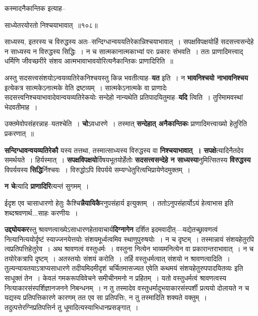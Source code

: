 \documentclass[article,12pt,a4paper]{memoir}
\begin{document}
	  \pstart कस्मादनैकान्तिक इत्याह--
	\pend
        
	  \bigskip
	  \begingroup
	

	  \pstart साध्येतरयोरतो निश्चयाभावात् ॥१०८॥
	\pend
      
	  \endgroup
	 

	  \pstart साध्यस्य, इतरस्य च विरुद्धस्य अतः--सन्दिग्धान्वययतिरेकान्निश्चयाभावात् । सपक्षविपक्षयोर्हि सदसत्त्वसन्देहे न साध्यस्य न विरुद्धस्य सिद्धिः । न च सात्मकानात्मकाभ्यां परः प्रकारः संभवति । ततः प्राणादिमत्त्वाद् धर्मिणि जीवच्छरीरे संशय आत्मभावाभावयोरित्यनैकान्तिकः प्राणादिरिति ॥
	\pend
      
	  \endgroup
	

	  \pstart अस्तु सदसत्त्वसंशयोऽन्वयव्यतिरेकनिश्चयस्तु किन्न भवतीत्याह--\textbf{यत} इति । न \textbf{भावनिश्चयो नाभावनिश्चय} इत्येकत्र सात्मकेऽनात्मके वेति द्रष्टव्यम् । सात्मकेऽनात्मके वा प्राणादेः सदसत्त्वनिश्चयाभावादेवान्वयव्यतिरेकयोः सन्देहो नान्यथेति प्रतिपादयितुमाह--\textbf{यदि} त्विति । तुरिमामवस्थां भेदवतीमाह ।
	\pend
      

	  \pstart उक्तमेवोपसंहरन्नाह--यतश्चेति । \textbf{चो}ऽवधारणे । तस्मात् \textbf{सन्देहात् अनैकान्तिकः} प्राणादिमत्त्वाख्यो हेतुरिति प्रकरणात् ॥
	\pend
      

	  \pstart \textbf{सन्दिग्धावन्वयव्यतिरेकौ} यस्य तत्तथा, तस्मात्साध्यस्य विरुद्धस्य वा \textbf{निश्चयाभावात् । सपक्षे}त्यादि\leavevmode{}नैतदेव समर्थयते । हिर्यस्मात् । \textbf{सपक्षविपक्षयो}र्विषयभूतयोर्हेतोः \textbf{सदसत्त्वसन्देहे न साध्यस्या}नुमित्सितस्य \textbf{विरुद्धस्य} विपर्ययस्य \textbf{सिद्धि}र्निश्चयः । विरुद्धोऽपि विपर्यये सम्यग्धेतुरित्यभिप्रायेणेदमुक्तम् ।
	\pend
      

	  \pstart \textbf{न चे}त्यादि \textbf{प्राणादिरि}त्यन्तं सुगमम् ।
	\pend
      

	  \pstart ईदृश एव चासाधारणो हेतुः कैश्चि\textbf{न्नैयायिकै}रनुपसंहार्य इत्युक्तम् । ततोऽनुपसंहार्योऽयं हेत्वाभास इति शब्दश्रवणार्थ...साहः करणीयः ।
	\pend
      

	  \pstart \textbf{उद्द्योयकर}स्तु श्रावणत्वाख्येऽसाधारणहेतावाचार्य\textbf{दिग्नागेन} दर्शित इदमवादीत्—यद्येतच्छ्रावणत्वं नित्यानित्ययोर्दृष्टं स्याज्जनयेत्तयोः संशयमूर्ध्वत्वमिव स्थाणुपुरुषयोः । न च दृष्टम् । तस्मान्नायं संशयहेतुरपि त्वप्रतिपत्तिहेतुरेव । अथ श्रावणत्वं वस्तुधर्मः । वस्तुना नित्येन भाव्यमनित्येन वा प्रकारान्तराभावात् । न च तयोरेकत्रापि दृष्टम् । अतस्तयोः संशयं करोति । तर्हि वस्तुधर्मत्वात् संशयो न श्रावणत्वादिति । तुल्यन्यायतयाऽत्राप्यसाधारणे तदीयमिदमीदृशं चर्चितमासज्यत एवेति कथमयं संशयहेतुरुपपादयितव्यः इति साधूक्तं तेन । केवलं गमकरूपविवेचने समीचीनमनो न प्रहितम् । यतो वस्तुधर्मत्वं श्रावणत्वस्य नित्याकारसंस्पर्शिज्ञानजनने निबन्धनम् । न तु तस्मादेव वस्तुधर्मादुभयाकारसंस्पर्शी प्रत्ययो दोलायते न च यद्यस्य प्रतिपत्तिकारणे कारणम् तत एव सा प्रतिपत्तिः, न तु तस्मादिति शक्यते वक्तुम् । तदुत्पत्तेरग्निप्रतिपत्तिर्न तु धूमादित्यस्याभिधानप्रसङ्गात् ।
	\pend
\end{document}
